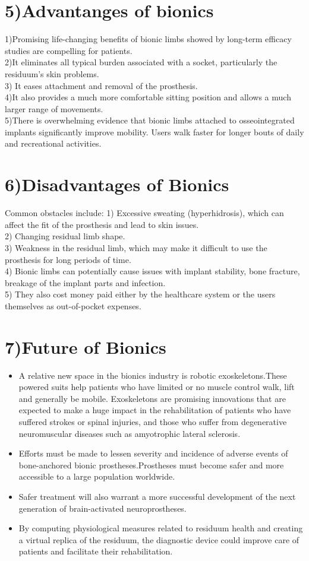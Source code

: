 \documentclass{report}
\begin{document}
\section*{5)Advantanges of bionics}
1)Promising life-changing benefits of bionic limbs showed by long-term efficacy studies are compelling for patients.\\
2)It eliminates all typical burden associated with a socket, particularly the residuum’s skin problems.\\
3) It eases attachment and removal of the prosthesis. \\
4)It also provides a much more comfortable sitting position and allows a much larger range of movements.\\
5)There is overwhelming evidence that bionic limbs attached to osseointegrated implants significantly improve mobility. Users walk faster for longer bouts of daily and recreational activities.
\section*{6)Disadvantages of Bionics}
Common obstacles include:
1) Excessive sweating (hyperhidrosis), which can affect the fit of the prosthesis and lead to skin issues.\\
2) Changing residual limb shape.\\
3) Weakness in the residual limb, which may make it difficult to use the prosthesis for long periods of time.\\
4) Bionic limbs can potentially cause issues with implant stability, bone fracture, breakage of the implant parts and infection.\\
5) They also cost money paid either by the healthcare system or the users themselves as out-of-pocket expenses.
\section*{7)Future of Bionics}
\begin{itemize}
\item A relative new space in the bionics industry is robotic exoskeletons.These powered suits help patients who have limited or no muscle control walk, lift and generally be mobile. Exoskeletons are promising innovations that are expected to make a huge impact in the rehabilitation of patients who have suffered strokes or spinal injuries, and those who suffer from degenerative neuromuscular diseases such as amyotrophic lateral sclerosis.
\item Efforts must be made to lessen severity and incidence of adverse events of bone-anchored bionic prostheses.Prostheses must become safer and more accessible to a large population worldwide.
\item Safer treatment will also warrant a more successful development of the next generation of brain-activated neuroprostheses.
\item By computing physiological measures related to residuum health and creating a virtual replica of the residuum, the diagnostic device could improve care of patients and facilitate their rehabilitation.
\end{itemize}
\end{document}
